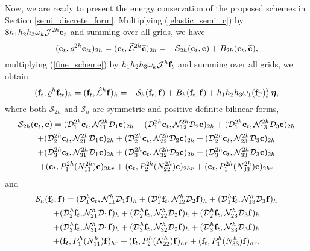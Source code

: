  Now, we are ready to present the energy conservation of the proposed schemes in Section \ref{semi_discrete_form}. Multiplying (\ref{elastic_semi_c}) by $8h_1h_2h_3\omega_k{\mathcal J}^{2h}{\bf c}_t$ and summing over all grids, we have
\begin{equation}\label{coarse_simple}
({\bf c}_t, {\varrho}^{2h}{\bf c}_{tt})_{2h} = ({\bf c}_t,\wt{\mathcal{L}}^{2h}\wt{{\bf c}})_{2h} = -\mathcal{S}_{2h}({\bf c}_t,{\bf c}) + B_{2h}({\bf c}_t,\wt{{\bf c}}),
\end{equation}
multiplying (\ref{fine_scheme}) by $h_1h_2h_3\omega_k{\mathcal J}^h{\bf f}_t$ and summing over all grids, we obtain
\begin{equation*}
({\bf f}_t, {\varrho}^h{\bf f}_{tt})_h = ({\bf f}_t,\hat{\mathcal{L}}^h{\bf f})_h = -\mathcal{S}_{h}({\bf f}_t,{\bf f}) + B_h({\bf f}_t,{\bf f}) 
+h_1h_2h_3\omega_1({\bf f}_\Gamma)_t^T{\bm \eta},
\end{equation*}
where  both $\mathcal{S}_{2h}$ and $\mathcal{S}_{h}$ are symmetric and positive definite bilinear forms, 
\begin{multline*}
\mathcal{S}_{2h}({\bf c}_t,{\bf c}) = (\mathcal{D}_1^{2h}{\bf c}_t,\mathcal{N}_{11}^{2h}\mathcal{D}_1{\bf c})_{2h} +  (\mathcal{D}_1^{2h}{\bf c}_t,\mathcal{N}_{12}^{2h}\mathcal{D}_2{\bf c})_{2h} +  (\mathcal{D}_1^{2h}{\bf c}_t,\mathcal{N}_{13}^{2h}\mathcal{D}_3{\bf c})_{2h}\\
 +  (\mathcal{D}_2^{2h}{\bf c}_t,\mathcal{N}_{21}^{2h}\mathcal{D}_1{\bf c})_{2h} 
+  (\mathcal{D}_2^{2h}{\bf c}_t,\mathcal{N}_{22}^{2h}\mathcal{D}_2{\bf c})_{2h} +  (\mathcal{D}_2^{2h}{\bf c}_t,\mathcal{N}_{23}^{2h}\mathcal{D}_3{\bf c})_{2h} \\
+  (\mathcal{D}_3^{2h}{\bf c}_t,\mathcal{N}_{31}^{2h}\mathcal{D}_1{\bf c})_{2h} 
+  (\mathcal{D}_3^{2h}{\bf c}_t,\mathcal{N}_{32}^{2h}\mathcal{D}_2{\bf c})_{2h} +  (\mathcal{D}_3^{2h}{\bf c}_t,\mathcal{N}_{33}^{2h}\mathcal{D}_3{\bf c})_{2h}\\
+ ({\bf c}_t, P^{2h}_1(N_{11}^{2h}){\bf c})_{2hr} + ({\bf c}_t, P^{2h}_2(N_{22}^{2h}){\bf c})_{2hr} + ({\bf c}_t, P^{2h}_1(N_{33}^{2h}){\bf c})_{2hr}
\end{multline*}
and 
\begin{multline*}
\mathcal{S}_{h}({\bf f}_t,{\bf f}) = (\mathcal{D}_1^{h}{\bf c}_t,\mathcal{N}_{11}^{h}\mathcal{D}_1{\bf f})_{h} +  (\mathcal{D}_1^{h}{\bf f}_t,\mathcal{N}_{12}^{h}\mathcal{D}_2{\bf f})_{h} +  (\mathcal{D}_1^{h}{\bf f}_t,\mathcal{N}_{13}^{h}\mathcal{D}_3{\bf f})_{h}\\
+  (\mathcal{D}_2^{h}{\bf f}_t,\mathcal{N}_{21}^{h}\mathcal{D}_1{\bf f})_{h} 
+  (\mathcal{D}_2^{h}{\bf f}_t,\mathcal{N}_{22}^{h}\mathcal{D}_2{\bf f})_{h} +  (\mathcal{D}_2^{h}{\bf f}_t,\mathcal{N}_{23}^{h}\mathcal{D}_3{\bf f})_{h} \\
+  (\mathcal{D}_3^{h}{\bf f}_t,\mathcal{N}_{31}^{h}\mathcal{D}_1{\bf f})_{h} 
+  (\mathcal{D}_3^{h}{\bf f}_t,\mathcal{N}_{32}^{h}\mathcal{D}_2{\bf f})_{h} +  (\mathcal{D}_3^{h}{\bf f}_t,\mathcal{N}_{33}^{h}\mathcal{D}_3{\bf f})_{h}\\
+ ({\bf f}_t, P^{h}_1(N_{11}^h){\bf f})_{hr} + ({\bf f}_t, P^{h}_2(N_{22}^h){\bf f})_{hr} + ({\bf f}_t, P^{h}_1(N_{33}^h){\bf f})_{hr}.
\end{multline*}
